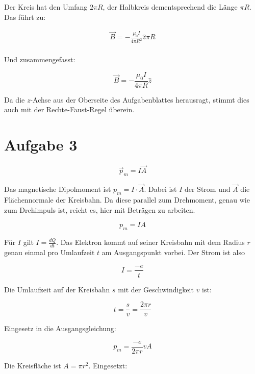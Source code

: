 \documentclass[a4paper,german,12pt,smallheadings]{scrartcl}
\begin{document}
Der Kreis hat den Umfang $2 \pi R$, der Halbkreis dementsprechend die Länge
$\pi R$. Das führt zu:

\begin{align}
  \vec{B} = -\frac{\mu_0 I}{4 \pi R^2} \widehat{z} \pi R \\
\end{align}

Und zusammengefasst:

\begin{equation}
  \vec{B} = -\frac{\mu_0 I}{4 \pi R} \widehat{z}
\end{equation}

Da die $z$-Achse aus der Oberseite des Aufgabenblattes herausragt, stimmt dies
auch mit der Rechte-Faust-Regel überein.

\section*{Aufgabe 3}

\begin{equation}
  \vec{p}_m = I \vec{A}
\end{equation}

Das magnetische Dipolmoment ist $p_m = I \cdot \vec{A}$. Dabei ist $I$ der
Strom und $\vec{A}$ die Flächennormale der Kreisbahn. Da diese parallel zum
Drehmoment, genau wie zum Drehimpuls ist, reicht es, hier mit Beträgen zu
arbeiten.

\begin{equation}
  p_m = I A
\end{equation}

Für $I$ gilt $I = \frac{dQ}{dt}$. Das Elektron kommt auf seiner Kreisbahn mit
dem Radius $r$ genau einmal pro Umlaufzeit $t$ am Ausgangspunkt vorbei. Der
Strom ist also

\begin{equation}
  I = \frac{-e}{t}
\end{equation}

Die Umlaufzeit auf der Kreisbahn $s$ mit der Geschwindigkeit $v$ ist:

\begin{equation}
  t = \frac{s}{v} = \frac{2 \pi r}{v}
\end{equation}

Eingesetz in die Ausgangsgleichung:

\begin{equation}
  p_m = \frac{-e}{2 \pi r} v A
\end{equation}

Die Kreisfläche ist $A = \pi r^2$. Eingesetzt:
\end{document}
